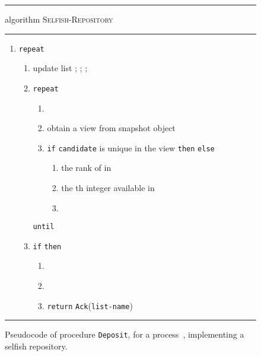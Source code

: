 \documentclass[11pt]{article}
\newcommand{\FF}{\vspace*{\medskipamount}}
\begin{document}
\begin{figure}[t]
\hrule

\FF

\textsf{algorithm} \textsc{Selfish-Repository}

\FF

\hrule

\FF

\begin{enumerate}[nosep]

\item
\texttt{repeat}

\begin{enumerate}[nosep]
\item
\label{sel-dep-update}
update list ; 
;
; 
\item
\texttt{repeat}
\begin{enumerate}[nosep]
\item

\item
obtain a view  from snapshot object 
\item
\texttt{if} \texttt{candidate} is unique in the view  \texttt{then}  \texttt{else} 
\begin{enumerate}[nosep]
\item
 the rank of  in  
\item
  the th integer available in 
\item

\end{enumerate}
\end{enumerate}
\texttt{until} 
\label{sel-dep-verify-null}
\item
\texttt{if}   \texttt{then}
\begin{enumerate}[nosep]
\item 
\label{sel-dep-store}

\item 


\item 
\label{sel-dep:ack}
\texttt{return} \texttt{Ack}(\texttt{list-name})
\end{enumerate}
\end{enumerate}
\end{enumerate}
\FF

\hrule

\FF

\caption{\label{fig:alg-selfish-deposit}
Pseudocode of procedure \texttt{Deposit}, for a process~, implementing a selfish repository.}
\end{figure}
\end{document}
